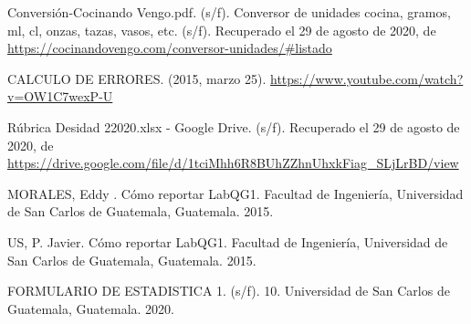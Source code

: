 \documentclass[osajnl,onecolumn,showpacs,superscriptaddress,12pt]{revtex4-1}
\begin{document}
\begin{thebibliography}{99}


\bibitem{} Conversión-Cocinando Vengo.pdf. (s/f).
Conversor de unidades cocina, gramos, ml, cl, onzas, tazas, vasos, etc. (s/f). Recuperado el 29 de agosto de 2020, de \url{https://cocinandovengo.com/conversor-unidades/#listado}

\bibitem{} CALCULO DE ERRORES. (2015, marzo 25). \url{https://www.youtube.com/watch?v=OW1C7wexP-U}

\bibitem{} Rúbrica Desidad 22020.xlsx - Google Drive. (s/f). Recuperado el 29 de agosto de 2020, de \url{https://drive.google.com/file/d/1tciMhh6R8BUhZZhnUhxkFiag_SLjLrBD/view}

\bibitem{} MORALES, Eddy . Cómo reportar LabQG1. Facultad de Ingeniería,
Universidad de San Carlos de Guatemala, Guatemala. 2015.

\bibitem{}  US, P. Javier. Cómo reportar LabQG1. Facultad de Ingeniería, Universidad
de San Carlos de Guatemala, Guatemala. 2015.

\bibitem{} FORMULARIO DE ESTADISTICA 1. (s/f). 10. Universidad de San Carlos de Guatemala, Guatemala. 2020.



\end{thebibliography}
\end{document}
